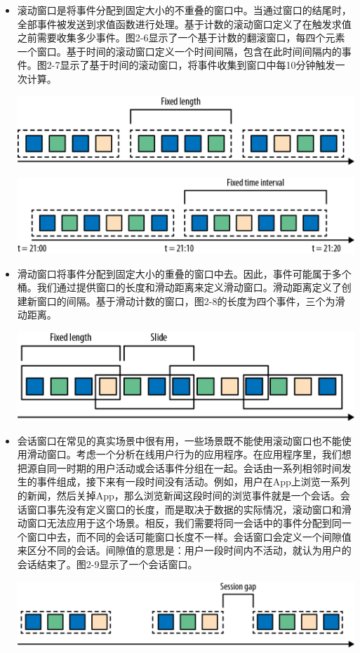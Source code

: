 \documentclass[oneside]{ctexbook}
\begin{document}
\begin{itemize}
  \item 滚动窗口是将事件分配到固定大小的不重叠的窗口中。当通过窗口的结尾时，全部事件被发送到求值函数进行处理。基于计数的滚动窗口定义了在触发求值之前需要收集多少事件。图2-6显示了一个基于计数的翻滚窗口，每四个元素一个窗口。基于时间的滚动窗口定义一个时间间隔，包含在此时间间隔内的事件。图2-7显示了基于时间的滚动窗口，将事件收集到窗口中每10分钟触发一次计算。

  \includegraphics{spaf_0206.png}

  \includegraphics{spaf_0207.png}

  \item 滑动窗口将事件分配到固定大小的重叠的窗口中去。因此，事件可能属于多个桶。我们通过提供窗口的长度和滑动距离来定义滑动窗口。滑动距离定义了创建新窗口的间隔。基于滑动计数的窗口，图2-8的长度为四个事件，三个为滑动距离。

  \includegraphics{spaf_0208.png}

  \item 会话窗口在常见的真实场景中很有用，一些场景既不能使用滚动窗口也不能使用滑动窗口。考虑一个分析在线用户行为的应用程序。在应用程序里，我们想把源自同一时期的用户活动或会话事件分组在一起。会话由一系列相邻时间发生的事件组成，接下来有一段时间没有活动。例如，用户在App上浏览一系列的新闻，然后关掉App，那么浏览新闻这段时间的浏览事件就是一个会话。会话窗口事先没有定义窗口的长度，而是取决于数据的实际情况，滚动窗口和滑动窗口无法应用于这个场景。相反，我们需要将同一会话中的事件分配到同一个窗口中去，而不同的会话可能窗口长度不一样。会话窗口会定义一个间隙值来区分不同的会话。间隙值的意思是：用户一段时间内不活动，就认为用户的会话结束了。图2-9显示了一个会话窗口。

  \includegraphics{spaf_0209.png}

\end{itemize}
\end{document}
